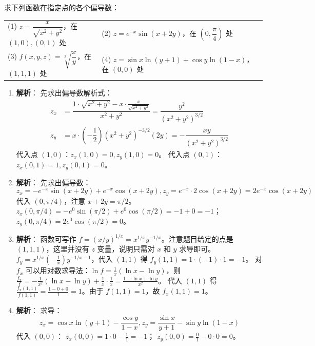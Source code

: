 \documentclass[lang=cn,11pt]{elegantbook}
\begin{document}
\begin{exercise}[指定点的偏导数计算]
求下列函数在指定点的各个偏导数：\\
\begin{tabular}{p{}p{}}
(1) $z = \dfrac{x}{\sqrt{x^2+y^2}}$，在 $(1,0),(0,1)$ 处 & (2) $z = e^{-x}\sin(x+2y)$，在 $(0,\dfrac{\pi}{4})$ 处 \\
(3) $f(x,y,z) = \sqrt[x]{\dfrac{x}{y}}$，在 $(1,1,1)$ 处 & (4) $z = \sin x\ln(y+1) + \cos y\ln(1-x)$，在 $(0,0)$ 处
\end{tabular}
\end{exercise}
\begin{solution}
\begin{enumerate}
  \item[(1)] \textbf{解析}：
  先求出偏导数解析式：
  \begin{align*}
  z_x &= \dfrac{1\cdot\sqrt{x^2+y^2} - x\cdot\frac{x}{\sqrt{x^2+y^2}}}{x^2+y^2} = \dfrac{y^2}{(x^2+y^2)^{3/2}}\\
  z_y &= x \cdot \left(-\dfrac{1}{2}\right)(x^2+y^2)^{-3/2}(2y) = -\dfrac{xy}{(x^2+y^2)^{3/2}}
  \end{align*}
  代入点 $(1,0)$：$z_x(1,0) = 0, z_y(1,0) = 0$。
  代入点 $(0,1)$：$z_x(0,1) = 1, z_y(0,1) = 0$。
  
  \item[(2)] \textbf{解析}：
  先求出偏导数：
  \[z_x = -e^{-x}\sin(x+2y) + e^{-x}\cos(x+2y),z_y = e^{-x} \cdot 2\cos(x+2y) = 2e^{-x}\cos(x+2y)\]
  代入 $(0, \pi/4)$，注意 $x+2y = \pi/2$。
  $z_x(0, \pi/4) = -e^0\sin(\pi/2) + e^0\cos(\pi/2) = -1 + 0 = -1$；
  $z_y(0, \pi/4) = 2e^0\cos(\pi/2) = 0$。
  
  \item[(3)] \textbf{解析}：
  函数可写作 $f = (x/y)^{1/x} = x^{1/x}y^{-1/x}$。注意题目给定的点是 $(1,1,1)$，这里并没有 $z$ 变量，说明只需对 $x$ 和 $y$ 求导即可。
  $f_y = x^{1/x} \left(-\frac{1}{x}\right) y^{-1/x-1}$，代入 $(1,1)$ 得 $f_y(1,1) = 1 \cdot (-1) \cdot 1 = -1$。
  对 $f_x$ 可以用对数求导法：$\ln f = \frac{1}{x}(\ln x - \ln y)$，则 $\frac{f_x}{f} = -\frac{1}{x^2}(\ln x - \ln y) + \frac{1}{x}\cdot\frac{1}{x} = \frac{1-\ln x+\ln y}{x^2}$。
  代入 $(1,1)$ 得 $\frac{f_x(1,1)}{f(1,1)} = \frac{1-0+0}{1} = 1$。由于 $f(1,1)=1$，故 $f_x(1,1) = 1$。
  
  \item[(4)] \textbf{解析}：
  求导：
  \[z_x = \cos x\ln(y+1) - \dfrac{\cos y}{1-x},z_y = \dfrac{\sin x}{y+1} - \sin y\ln(1-x)\]
  代入 $(0,0)$：
  $z_x(0,0) = 1\cdot 0 - \frac{1}{1} = -1$；
  $z_y(0,0) = \frac{0}{1} - 0 \cdot 0 = 0$。
\end{enumerate}
\end{solution}
\end{document}
